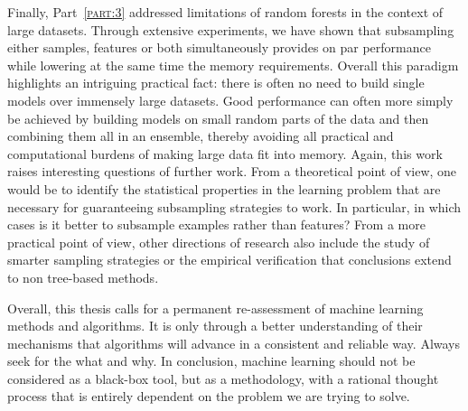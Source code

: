 Finally, Part~\textsc{\ref{part:3}} addressed limitations of random forests in
the context of large datasets. Through extensive experiments, we have shown
that subsampling either samples, features or both simultaneously provides on
par performance while lowering at the same time the memory requirements.
Overall this paradigm highlights an intriguing practical fact: there is often
no need to build single models over immensely large datasets. Good performance
can often more simply be achieved by building models on small random parts of the
data and then combining them all in an ensemble, thereby avoiding all practical and
computational burdens of making large data fit into memory. Again, this work
raises interesting questions of further work. From a theoretical point of view,
one would be to identify the statistical properties in the learning problem
that are necessary for guaranteeing subsampling strategies to work. In
particular, in which cases is it better to subsample examples rather than
features? From a more practical point of view, other directions of research
also include the study of smarter sampling strategies or the empirical
verification that conclusions extend to non tree-based methods.

Overall, this thesis calls for a permanent re-assessment of machine learning
methods and algorithms. It is only through a better understanding of their
mechanisms that algorithms will advance in a consistent and reliable way.
Always seek for the what and why. In conclusion, machine learning should not be
considered as a black-box tool, but as a methodology, with a rational thought
process that is entirely dependent on the problem we are trying to solve.
